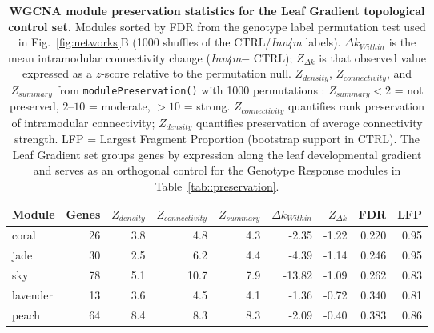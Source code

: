 \documentclass[9pt,twocolumn,twoside]{rilabRxiv}
\newcommand{\invfour}{\textit{Inv4m}\xspace}
\begin{document}
\begin{table}[!ht]
\caption{\textbf{WGCNA module preservation statistics for the Leaf Gradient topological control set.} Modules sorted by FDR from the genotype label permutation test used in Fig.~\ref{fig:networks}B (1000 shuffles of the CTRL/\invfour labels). $\Delta k_{Within}$ is the mean intramodular connectivity change (\invfour $-$ CTRL); $Z_{\Delta k}$ is that observed value expressed as a $z$-score relative to the permutation null. $Z_{density}$, $Z_{connectivity}$, and $Z_{summary}$ from \texttt{modulePreservation()} with 1000 permutations \cite{langfelder2011}: $Z_{summary} < 2$ = not preserved, $2$--$10$ = moderate, $> 10$ = strong. $Z_{connectivity}$ quantifies rank preservation of intramodular connectivity; $Z_{density}$ quantifies preservation of average connectivity strength. LFP = Largest Fragment Proportion (bootstrap support in CTRL). The Leaf Gradient set groups genes by expression along the leaf developmental gradient and serves as an orthogonal control for the Genotype Response modules in Table~\ref{tab::preservation}.}
\label{tab::preservation_lg}
\centering
\small
\begin{tabular}{@{}lrrrrrrrr@{}}
\toprule
\textbf{Module} & \textbf{Genes} & \textbf{$Z_{density}$} & \textbf{$Z_{connectivity}$} & \textbf{$Z_{summary}$} & \textbf{$\Delta k_{Within}$} & \textbf{$Z_{\Delta k}$} & \textbf{FDR} & \textbf{LFP} \\
\midrule
coral & 26 & 3.8 & 4.8 & 4.3 & -2.35 & -1.22 & 0.220 & 0.95 \\
jade & 30 & 2.5 & 6.2 & 4.4 & -4.39 & -1.14 & 0.246 & 0.95 \\
sky & 78 & 5.1 & 10.7 & 7.9 & -13.82 & -1.09 & 0.262 & 0.83 \\
lavender & 13 & 3.6 & 4.5 & 4.1 & -1.36 & -0.72 & 0.340 & 0.81 \\
peach & 64 & 8.4 & 8.3 & 8.3 & -2.09 & -0.40 & 0.383 & 0.86 \\
\bottomrule
\end{tabular}
\end{table}
\end{document}
